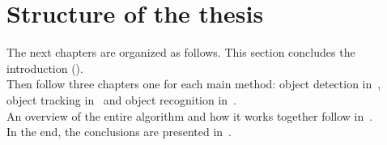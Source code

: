 \section{Structure of the thesis}
The next chapters are organized as follows. This section concludes the introduction ().\\
Then follow three chapters one for each main method: object detection in~, object tracking in~ and object recognition in~.\\
An overview of the entire algorithm and how it works together follow  in~.\\
In the end, the conclusions are presented in~.






